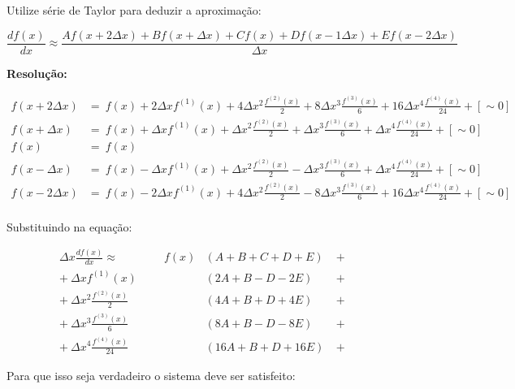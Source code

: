\documentclass[11pt]{homework}
\begin{document}
    \newpage
    \question
    \begin{alphaparts}
        
        \questionpart Utilize série de Taylor para deduzir a aproximação:
        
        \begin{equation*}
            \frac{df(x)}{dx} \approx \frac{Af(x+2\Delta x) + Bf(x+\Delta x) + Cf(x) + Df(x-1\Delta x) + Ef(x-2\Delta x)}{\Delta x}
        \end{equation*}
        
        \textbf{Resolução:}
        
        \begin{align*}
            f(x+2\Delta x) & =\ 
            f(x) + 2\Delta xf^{(1)}(x) +4\Delta x^2\frac{f^{(2)}(x)}{2} +8\Delta x^3\frac{f^{(3)}(x)}{6} + 16\Delta x^4\frac{f^{(4)}(x)}{24} + [\sim 0]\\
            f(x+\Delta x) & =\ 
            f(x) + \Delta xf^{(1)}(x) +\Delta x^2\frac{f^{(2)}(x)}{2} +\Delta x^3\frac{f^{(3)}(x)}{6} + \Delta x^4\frac{f^{(4)}(x)}{24} + [\sim 0]\\
            f(x) & =\
            f(x) \\
            f(x-\Delta x) & =\ 
            f(x) - \Delta xf^{(1)}(x) +\Delta x^2\frac{f^{(2)}(x)}{2} -\Delta x^3\frac{f^{(3)}(x)}{6} + \Delta x^4\frac{f^{(4)}(x)}{24} + [\sim 0]\\
            f(x-2\Delta x) & =\ 
            f(x) - 2\Delta xf^{(1)}(x) +4\Delta x^2\frac{f^{(2)}(x)}{2} -8\Delta x^3\frac{f^{(3)}(x)}{6} + 16\Delta x^4\frac{f^{(4)}(x)}{24} + [\sim 0]\\
        \end{align*}
        
        Substituindo na equação:
        
        \begin{align*}
            \Delta x\frac{df(x)}{dx} \approx
             \qquad \qquad  f(x) & (A+B+C+D+E)\ &+ &&\\
             +\ \Delta xf^{(1)}(x) & (2A+B-D-2E)\ &+ &&\\
             +\ \Delta x^2\frac{f^{(2)}(x)}{2} & (4A+B+D+4E)\ &+ &&\\
             +\ \Delta x^3\frac{f^{(3)}(x)}{6} & (8A+B-D-8E)\ &+ &&\\
             +\ \Delta x^4\frac{f^{(4)}(x)}{24} & (16A+B+D+16E)\ &+ && 
        \end{align*}
        
        Para que isso seja verdadeiro o sistema deve ser satisfeito:
        

\end{alphaparts}
\end{document}
